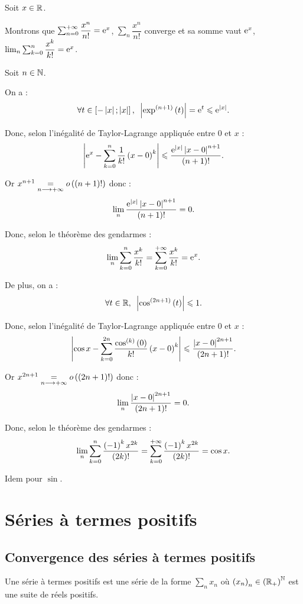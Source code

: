 \begin{dem}
Soit \(x\in\mathbb{R}\).

Montrons que \(\sum_{n=0}^{+\infty}\dfrac{x^n}{n!}=\mathrm{e}^{x}\), \cad \(\sum_n\dfrac{x^n}{n!}\) converge et sa somme vaut \(\mathrm{e}^{x}\), \cad \(\lim_n\sum_{k=0}^n\dfrac{x^k}{k!}=\mathrm{e}^{x}\).

Soit \(n\in\mathbb{N}\).

On a : \[\quantifs{\forall t\in\intervii{-\abs{x}}{\abs{x}}}\abs{\exp\deriv{n+1}\paren{t}}=\e{t}\leq\e{\abs{x}}.\]

Donc, selon l'inégalité de Taylor-Lagrange appliquée entre \(0\) et \(x\) : \[\left\lvert\mathrm{e}^{x}-\sum_{k=0}^n\dfrac{1}{k!}\left(x-0\right)^k\right\rvert\leqslant\dfrac{\mathrm{e}^{\left\lvert x\right\rvert}\left\lvert x-0\right\rvert^{n+1}}{\left(n+1\right)!}.\]

Or \(x^{n+1}\underset{n\longrightarrow+\infty}{=}o\left(\left(n+1\right)!\right)\) donc : \[\lim_n\dfrac{\mathrm{e}^{\left\lvert x\right\rvert}\left\lvert x-0\right\rvert^{n+1}}{\left(n+1\right)!}=0.\]

Donc, selon le théorème des gendarmes : \[\lim_n\sum_{k=0}^n\dfrac{x^k}{k!}=\sum_{k=0}^{+\infty}\dfrac{x^k}{k!}=\mathrm{e}^{x}.\]

De plus, on a : \[\quantifs{\forall t\in\R}\abs{\cos\deriv{2n+1}\paren{t}}\leq1.\]

Donc, selon l'inégalité de Taylor-Lagrange appliquée entre \(0\) et \(x\) : \[\left\lvert\cos x-\sum_{k=0}^{2n}\dfrac{\cos^{\left(k\right)}\left(0\right)}{k!}\left(x-0\right)^k\right\rvert\leqslant\dfrac{\left\lvert x-0\right\rvert^{2n+1}}{\left(2n+1\right)!}.\]

Or \(x^{2n+1}\underset{n\longrightarrow+\infty}{=}o\left(\left(2n+1\right)!\right)\) donc : \[\lim_n\dfrac{\left\lvert x-0\right\rvert^{2n+1}}{\left(2n+1\right)!}=0.\]

Donc, selon le théorème des gendarmes : \[\lim_n\sum_{k=0}^n\dfrac{\left(-1\right)^kx^{2k}}{\left(2k\right)!}=\sum_{k=0}^{+\infty}\dfrac{\left(-1\right)^kx^{2k}}{\left(2k\right)!}=\cos x.\]

Idem pour \(\sin\).
\end{dem}

\section{Séries à termes positifs}

\subsection{Convergence des séries à termes positifs}

\begin{defi}
Une série à termes positifs est une série de la forme \(\sum_nx_n\) où \(\left(x_n\right)_n\in\left(\mathbb{R}_+\right)^{\mathbb{N}}\) est une suite de réels positifs.
\end{defi}

